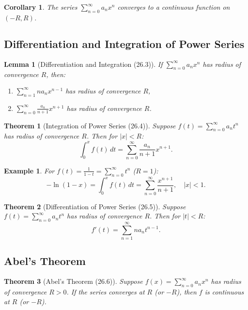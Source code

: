 \documentclass[9pt]{article}
\theoremstyle{definition}
\theoremstyle{plain}
\newtheorem{theorem}{Theorem}
\newtheorem{example}{Example}
\newtheorem{corollary}{Corollary}
\newtheorem{lemma}{Lemma}
\begin{document}
\begin{corollary}
The series \( \sum_{n=0}^\infty a_n x^n \) converges to a continuous function on \( (-R, R) \).
\end{corollary}

\subsection*{Differentiation and Integration of Power Series}
\begin{lemma}[Differentiation and Integration (26.3)]
If \( \sum_{n=0}^\infty a_n x^n \) has radius of convergence \( R \), then:
\begin{enumerate}
    \item \( \sum_{n=1}^\infty n a_n x^{n-1} \) has radius of convergence \( R \),
    \item \( \sum_{n=0}^\infty \frac{a_n}{n+1} x^{n+1} \) has radius of convergence \( R \).
\end{enumerate}
\end{lemma}

\begin{theorem}[Integration of Power Series (26.4)]
Suppose \( f(t) = \sum_{n=0}^\infty a_n t^n \) has radius of convergence \( R \). Then for \( |x| < R \):
\[
\int_0^x f(t) \, dt = \sum_{n=0}^\infty \frac{a_n}{n+1} x^{n+1}.
\]
\end{theorem}

\begin{example}
For \( f(t) = \frac{1}{1-t} = \sum_{n=0}^\infty t^n \) (\( R = 1 \)):
\[
-\ln(1-x) = \int_0^x f(t) \, dt = \sum_{n=0}^\infty \frac{x^{n+1}}{n+1}, \quad |x| < 1.
\]
\end{example}

\begin{theorem}[Differentiation of Power Series (26.5)]
Suppose \( f(t) = \sum_{n=0}^\infty a_n t^n \) has radius of convergence \( R \). Then for \( |t| < R \):
\[
f'(t) = \sum_{n=1}^\infty n a_n t^{n-1}.
\]
\end{theorem}

\subsection*{Abel’s Theorem}
\begin{theorem}[Abel’s Theorem (26.6)]
Suppose \( f(x) = \sum_{n=0}^\infty a_n x^n \) has radius of convergence \( R > 0 \). If the series converges at \( R \) (or \( -R \)), then \( f \) is continuous at \( R \) (or \( -R \)).
\end{theorem}
\end{document}
